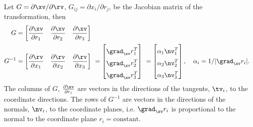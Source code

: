 \documentclass[11pt]{article}
\begin{document}
Let $G=\partial\xv/\partial \rv$, $G_{ij}=\partial x_i/\partial r_j$,  be the Jacobian matrix of the transformation, then
{
\newcommand{\mstrut}{\rule{0pt}{15pt}}%
\newcommand{\ds}{\displaystyle}
\newcommand{\dsm}{\displaystyle\mstrut}
\begin{align*}
    G &= \begin{bmatrix} \ds\frac{\partial\xv}{\partial r_1} &  \ds\frac{\partial\xv}{\partial r_2} &  \ds\frac{\partial\xv}{\partial r_3}\end{bmatrix}  \\
 G^{-1} &= \begin{bmatrix} \ds\frac{\partial\rv}{\partial x_1} &  \ds\frac{\partial\rv}{\partial x_2} &  \ds\frac{\partial\rv}{\partial x_3}\end{bmatrix}
   ~= \begin{bmatrix} \dsm\grad_{\xv} r_1^T \\ \dsm\grad_{\xv} r_2^T \\ \dsm\grad_{\xv} r_3^T \\ \end{bmatrix}
   ~= \begin{bmatrix}  \dsm\alpha_1 \nv_1^T  \\ \dsm\alpha_2\nv_2^T \\ \dsm\alpha_3 \nv_3^T \\ \end{bmatrix}, \quad \alpha_i=1/|\grad_{\xv} r_i|.
\end{align*}
The columns of $G$, $\frac{\partial\xv}{\partial r_i}$ are vectors in the directions of the tangents, $\tv_i$, to the coordinate directions. 
The rows of $G^{-1}$ are vectors in the directions of the normals, $\nv_i$, to the coordinate planes, i.e. $\grad_{\xv} r_i$ is
proportional to the normal to the coordinate plane $r_i=\text{constant}$. 
}

\clearpage


\clearpage



\clearpage








\vfill\eject


\end{document}
